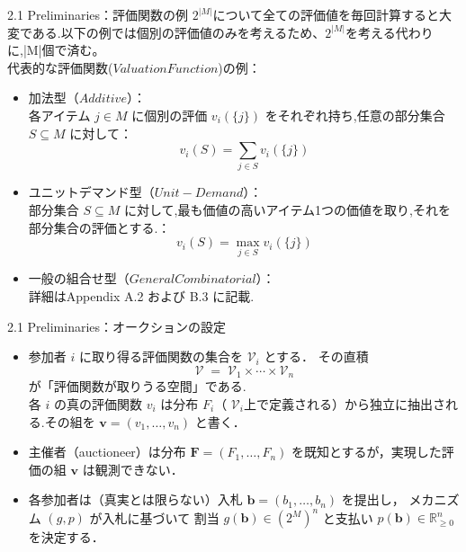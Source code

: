 \documentclass[dvipdfmx,autodetect-engine]{beamer}
\begin{document}
\begin{frame}{2.1  Preliminaries：評価関数の例}
  \small
  $2^{\lvert M \rvert}$について全ての評価値を毎回計算すると大変である.以下の例では個別の評価値のみを考えるため、$2^{\lvert M \rvert}$を考える代わりに,|M|個で済む。\\
  代表的な評価関数($Valuation Function$)の例：
  \begin{itemize}
    \item 加法型（$Additive$）：  \\
    各アイテム $j \in M$ に個別の評価 $v_i(\{j\})$ をそれぞれ持ち,任意の部分集合 $S \subseteq M$ に対して：  
    \[
    v_i(S) = \sum_{j \in S} v_i(\{j\})
    \]
    \item ユニットデマンド型（$Unit-Demand$）：\\  
    部分集合 $S \subseteq M$ に対して,最も価値の高いアイテム1つの価値を取り,それを部分集合の評価とする.：  
    \[
    v_i(S) = \max_{j \in S} v_i(\{j\})
    \]
    \item 一般の組合せ型（$General Combinatorial$）：\\  
    詳細はAppendix A.2 および B.3 に記載.
  \end{itemize}
\end{frame}

\begin{frame}{2.1  Preliminaries：オークションの設定}
  \small
  \begin{itemize}
    \item 参加者 $i$ に取り得る評価関数の集合を $\mathcal{V}_i$ とする．  
          その直積
          \[
            \mathcal{V}\;=\;\mathcal{V}_1 \times \cdots \times \mathcal{V}_n
          \]
          が「評価関数が取りうる空間」である.\\
          各 $i$ の真の評価関数 $v_i$ は分布 $F_i$（ $\mathcal{V}_i$上で定義される）から独立に抽出される.その組を $\mathbf{v}=(v_1,\ldots,v_n)$ と書く．
    \item 主催者（auctioneer）は分布  
          $\mathbf{F}=(F_1,\ldots,F_n)$ を既知とするが，実現した評価の組 $\mathbf{v}$ は観測できない．
    \item 各参加者は（真実とは限らない）入札 $\mathbf{b}=(b_1,\ldots,b_n)$ を提出し，  
          メカニズム $(g,p)$ が入札に基づいて  
          割当 $g(\mathbf{b})\in(2^{M})^{n}$ と支払い $p(\mathbf{b})\in\mathbb{R}^{n}_{\ge0}$ を決定する．
  \end{itemize}
\end{frame}
\end{document}
